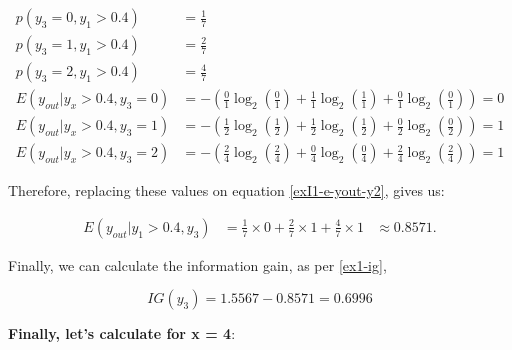 \documentclass[12pt]{article}
\begin{document}
\begin{enumerate}[leftmargin=\labelsep]
    \[
        \begin{aligned}
            p(y_3 = 0, y_1 > 0.4)          & = \frac{1}{7}                                                                                       \\
            p(y_3 = 1, y_1 > 0.4)          & = \frac{2}{7}                                                                                       \\
            p(y_3 = 2, y_1 > 0.4)          & = \frac{4}{7}                                                                                       \\
            E(y_{out} | y_x > 0.4 , y_3 = 0) & = - \left(\frac{0}{1} \log_2\left(\frac{0}{1}\right) + \frac{1}{1} \log_2\left(\frac{1}{1}\right)
                + \frac{0}{1} \log_2\left(\frac{0}{1}\right)\right) = 0                                                                          \\
            E(y_{out} | y_x > 0.4 , y_3 = 1) & = - \left(\frac{1}{2} \log_2\left(\frac{1}{2}\right) + \frac{1}{2} \log_2\left(\frac{1}{2}\right)
                + \frac{0}{2} \log_2\left(\frac{0}{2}\right)\right) = 1                                                                          \\
            E(y_{out} | y_x > 0.4 , y_3 = 2) & = - \left(\frac{2}{4} \log_2\left(\frac{2}{4}\right) + \frac{0}{4} \log_2\left(\frac{0}{4}\right)
                + \frac{2}{4} \log_2\left(\frac{2}{4}\right)\right) = 1
        \end{aligned}
    \]

    Therefore, replacing these values on equation \eqref{exI1-e-yout-y2}, gives us:

    \[
        \begin{aligned}
            E(y_{out} | y_1>0.4, y_3) & = \frac{1}{7} \times 0 + \frac{2}{7} \times 1 +  \frac{4}{7} \times 1 & \approx 0.8571.
        \end{aligned}
    \]

    Finally, we can calculate the information gain, as per \eqref{ex1-ig},

    \[
        IG(y_{3}) = 1.5567 - 0.8571 = 0.6996
    \]

    \textbf{Finally, let's calculate for x = 4}:


\end{enumerate}
\end{document}

